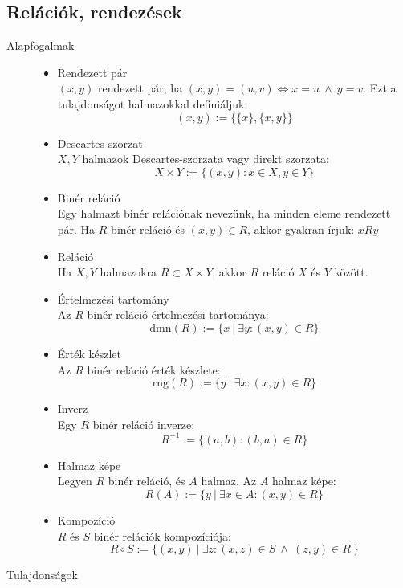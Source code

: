 \documentclass[margin=0px]{article}
\begin{document}
		\subsection{Relációk, rendezések}
			\begin{description}
				\item[Alapfogalmak] \hfill
					\begin{itemize}
						\item Rendezett pár \\
							$(x,y)$ rendezett pár, ha $(x,y) = (u,v) \Longleftrightarrow x = u \ \land \ y = v$. Ezt a tulajdonságot halmazokkal definiáljuk:
							\[ (x,y) := \{ \{x\}, \{x, y\} \} \]
						\item Descartes-szorzat \\
							$X,Y$ halmazok Descartes-szorzata vagy direkt szorzata:
							\[ X \times Y := \{ (x,y) : x \in X, y \in Y \} \]
						\item Binér reláció \\
							Egy halmazt binér relációnak nevezünk, ha minden eleme rendezett pár. 
							Ha $R$ binér reláció és $(x,y) \in R$, akkor gyakran írjuk: $xRy$
						\item Reláció \\
							Ha $X,Y$ halmazokra $R \subset X\times Y$, akkor $R$ reláció $X$ és $Y$ között.
						\item Értelmezési tartomány \\
							Az $R$ binér reláció értelmezési tartománya:
							\[ \textrm{dmn}(R) := \{ x\  | \ \exists y : (x,y)\in R  \}\]
						\item Érték készlet \\
							Az $R$ binér reláció érték készlete:
							\[ \textrm{rng}(R) := \{ y\  | \ \exists x : (x,y)\in R  \}\]
						\item Inverz \\
							Egy $R$ binér reláció inverze:
							\[R^{-1} := \{(a,b) : (b,a) \in R\} \]
						\item Halmaz képe \\
							Legyen $R$ binér reláció, és $A$ halmaz. Az $A$ halmaz képe:
							\[R(A) := \{y \ | \ \exists x\in A: (x,y) \in R\} \]
						\item Kompozíció \\
							$R$ és $S$ binér relációk kompozíciója:
							\[ R \circ S := \{ (x,y) \ | \ \exists z : (x,z) \in S \ \land \ (z,y) \in R \ \} \]
					\end{itemize}
				\item[Tulajdonságok] \hfill \\

\end{description}
\end{document}
